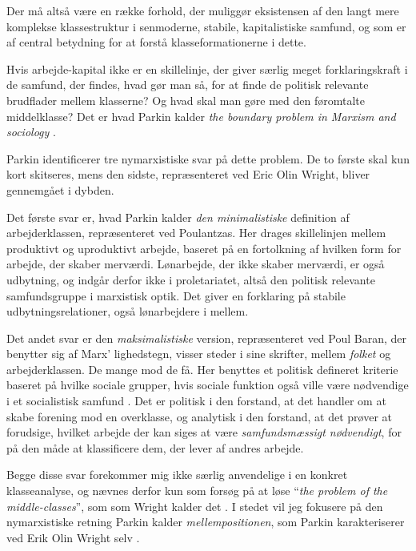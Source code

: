Der må altså være en række forhold, der muliggør eksistensen af den langt mere komplekse klassestruktur i senmoderne, stabile, kapitalistiske samfund, og som er af central betydning for at forstå klasseformationerne i dette.

Hvis arbejde-kapital ikke er en skillelinje, der giver særlig meget forklaringskraft i de samfund, der findes, hvad gør man så, for at finde de politisk relevante brudflader mellem klasserne? Og hvad skal man gøre med den føromtalte middelklasse? Det er hvad Parkin kalder \emph{the boundary problem in Marxism and sociology} \parencite[11]{Parkin1979}. 

Parkin identificerer tre nymarxistiske svar på dette problem. De to første skal kun kort skitseres, mens den sidste, repræsenteret ved Eric Olin Wright, bliver gennemgået i dybden. 

Det første svar er, hvad Parkin kalder \emph{den minimalistiske} definition af arbejderklassen, repræsenteret ved Poulantzas. Her drages skillelinjen mellem produktivt og uproduktivt arbejde, baseret på en fortolkning af hvilken form for arbejde, der skaber merværdi. Lønarbejde, der ikke skaber merværdi, er også udbytning, og indgår derfor ikke i proletariatet, altså den politisk relevante samfundsgruppe i marxistisk optik. Det giver en forklaring på stabile udbytningsrelationer, også lønarbejdere i mellem. 

Det andet svar er den \emph{maksimalistiske} version, repræsenteret ved Poul Baran, der benytter sig af Marx' lighedstegn, visser steder i sine skrifter, mellem \emph{folket} og arbejderklassen. De mange mod de få. Her benyttes et politisk defineret kriterie baseret på hvilke sociale grupper, hvis sociale funktion også ville være nødvendige i et socialistisk samfund \parencite[20]{Parkin1979}. Det er politisk i den forstand, at det handler om at skabe forening mod en overklasse, og analytisk i den forstand, at det prøver at forudsige, hvilket arbejde der kan siges at være \emph{samfundsmæssigt nødvendigt}, for på den måde at klassificere dem, der lever af andres arbejde.  

Begge disse svar forekommer mig ikke særlig anvendelige i en konkret klasseanalyse, og nævnes derfor kun som forsøg på at løse “\emph{the problem of the middle-classes}”, som som Wright kalder det \parencite[15]{Wright2000}. I stedet vil jeg fokusere på den nymarxistiske retning Parkin kalder \emph{mellempositionen}, som Parkin karakteriserer ved Erik Olin Wright selv \parencite[17]{Parkin1979}.


